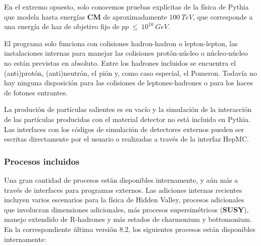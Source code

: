 En el extremo opuesto, solo conocemos pruebas explícitas de la física de Pythia que modela hasta energías \textbf{CM} de aproximadamente $100~TeV$, que corresponde a una energía de haz de objetivo fijo de $pp~\leq~10^{10}~GeV$. 

El programa solo funciona con colisiones hadron-hadron o lepton-lepton, las instalaciones internas para manejar las colisiones protón-núcleo o núcleo-núcleo no están previstas en absoluto. Entre los hadrones incluidos se encuentra el (anti)protón, (anti)neutrón, el pión y, como caso especial, el Pomeron. Todavía no hay ninguna disposición para las colisiones de leptones-hadrones o para los haces de fotones entrantes.

La produción de partículas salientes es en vacío y la simulación de la interacción de las partículas producidas con el material detector no está incluida en Pythia. Las interfaces con los códigos de simulación de detectores externos pueden ser escritas directamente por el usuario o realizadas a través de la interfaz HepMC.

\subsubsection{Procesos incluidos}

Una gran cantidad de procesos están disponibles internamente, y aún más a través de interfaces para programas externos. Las adiciones internas recientes incluyen varios escenarios para la física de Hidden Valley, procesos adicionales que involucran dimensiones adicionales, más procesos supersimétricos (\textbf{SUSY}), manejo extendido de R-hadrones y más estados de charmonium y bottomonium. En la correspondiente última versión 8.2, los siguientes procesos están disponibles internamente:

